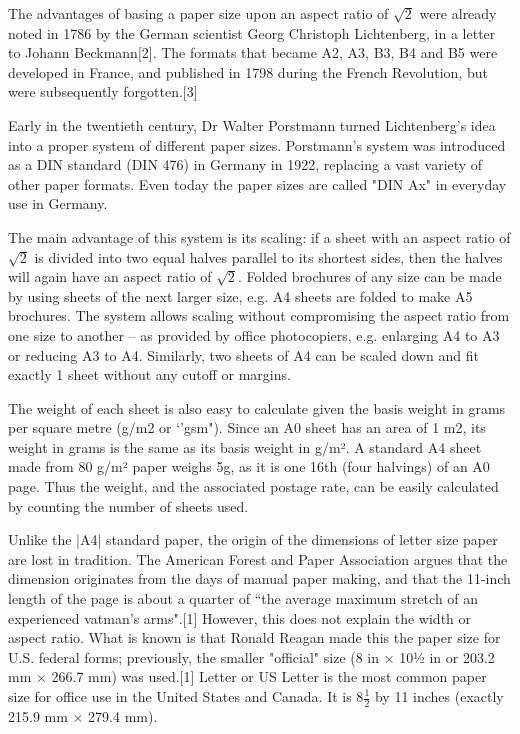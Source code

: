The advantages of basing a paper size upon an aspect ratio of $\surd{2}$ were already noted in 1786 by the German scientist Georg Christoph Lichtenberg, in a letter to Johann Beckmann[2]. The formats that became A2, A3, B3, B4 and B5 were developed in France, and published in 1798 during the French Revolution, but were subsequently forgotten.[3]

Early in the twentieth century, Dr Walter Porstmann turned Lichtenberg's idea into a proper system of different paper sizes. Porstmann's system was introduced as a DIN standard (DIN 476) in Germany in 1922, replacing a vast variety of other paper formats. Even today the paper sizes are called "DIN Ax" in everyday use in Germany.

The main advantage of this system is its scaling: if a sheet with an aspect ratio of $\surd{2}$ is divided into two equal halves parallel to its shortest sides, then the halves will again have an aspect ratio of $\surd{2}$. Folded brochures of any size can be made by using sheets of the next larger size, e.g. A4 sheets are folded to make A5 brochures. The system allows scaling without compromising the aspect ratio from one size to another – as provided by office photocopiers, e.g. enlarging A4 to A3 or reducing A3 to A4. Similarly, two sheets of A4 can be scaled down and fit exactly 1 sheet without any cutoff or margins.

\thispagestyle{grid}

\drawlist

The weight of each sheet is also easy to calculate given the basis weight in grams per square metre (g/m2 or `'gsm"). Since an A0 sheet has an area of 1 m2, its weight in grams is the same as its basis weight in g/m². A standard A4 sheet made from 80 g/m² paper weighs 5g, as it is one 16th (four halvings) of an A0 page. Thus the weight, and the associated postage rate, can be easily calculated by counting the number of sheets used.

Unlike the |A4| standard paper, the origin of the dimensions of letter size paper are lost in tradition. The American Forest and Paper Association argues that the dimension originates from the days of manual paper making, and that the 11-inch length of the page is about a quarter of ``the average maximum stretch of an experienced vatman's arms".[1] However, this does not explain the width or aspect ratio. What is known is that Ronald Reagan made this the paper size for U.S. federal forms; previously, the smaller "official" size (8 in × 10½ in or 203.2 mm × 266.7 mm) was used.[1] Letter or US Letter is the most common paper size for office use in the United States and Canada. It is 8$\frac{1}{2}$ by 11 inches (exactly 215.9 mm × 279.4 mm).

